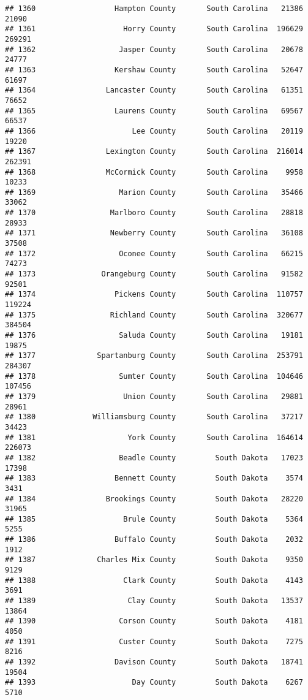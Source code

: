 \documentclass[
]{article}
\begin{document}
\begin{verbatim}
## 1360                  Hampton County       South Carolina   21386   21090
## 1361                    Horry County       South Carolina  196629  269291
## 1362                   Jasper County       South Carolina   20678   24777
## 1363                  Kershaw County       South Carolina   52647   61697
## 1364                Lancaster County       South Carolina   61351   76652
## 1365                  Laurens County       South Carolina   69567   66537
## 1366                      Lee County       South Carolina   20119   19220
## 1367                Lexington County       South Carolina  216014  262391
## 1368                McCormick County       South Carolina    9958   10233
## 1369                   Marion County       South Carolina   35466   33062
## 1370                 Marlboro County       South Carolina   28818   28933
## 1371                 Newberry County       South Carolina   36108   37508
## 1372                   Oconee County       South Carolina   66215   74273
## 1373               Orangeburg County       South Carolina   91582   92501
## 1374                  Pickens County       South Carolina  110757  119224
## 1375                 Richland County       South Carolina  320677  384504
## 1376                   Saluda County       South Carolina   19181   19875
## 1377              Spartanburg County       South Carolina  253791  284307
## 1378                   Sumter County       South Carolina  104646  107456
## 1379                    Union County       South Carolina   29881   28961
## 1380             Williamsburg County       South Carolina   37217   34423
## 1381                     York County       South Carolina  164614  226073
## 1382                   Beadle County         South Dakota   17023   17398
## 1383                  Bennett County         South Dakota    3574    3431
## 1384                Brookings County         South Dakota   28220   31965
## 1385                    Brule County         South Dakota    5364    5255
## 1386                  Buffalo County         South Dakota    2032    1912
## 1387              Charles Mix County         South Dakota    9350    9129
## 1388                    Clark County         South Dakota    4143    3691
## 1389                     Clay County         South Dakota   13537   13864
## 1390                   Corson County         South Dakota    4181    4050
## 1391                   Custer County         South Dakota    7275    8216
## 1392                  Davison County         South Dakota   18741   19504
## 1393                      Day County         South Dakota    6267    5710

\end{verbatim}
\end{document}
